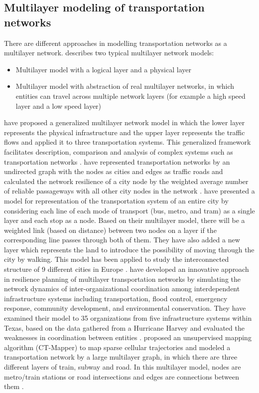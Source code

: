 \documentclass[11pt,twoside]{article}
\numberwithin{equation}{section}
\newcommand{\?}{\stackrel{?}{=}}
\begin{document}
\subsection{Multilayer modeling of transportation networks}
There are different approaches in modelling transportation networks as a multilayer network.
\citep{wu2020traffic} describes two typical multilayer network models:
\begin{itemize}
  \item Multilayer model with a logical layer and a physical layer
  \item Multilayer model with abstraction of real multilayer networks, in which entities can travel across multiple network layers (for example a high speed layer and a low speed layer)
\end{itemize}
\citet{kurant2006layered} have proposed a generalized multilayer network model in which the lower layer represents the
physical infrastructure and the upper layer represents the traffic flows and applied it to three transportation
systems. This generalized framework facilitates description, comparison and analysis of complex systems such as
transportation networks \citep{kurant2006layered}. \citet{ip2011resilience} have represented transportation networks by
an undirected graph with the nodes as cities and edges as traffic roads and calculated the network resilience of a city
node by the weighted average number of reliable passageways with all other city nodes in the network
\citep{ip2011resilience}. \citet{aleta2017multilayer} have presented a model for representation of the transportation
system of an entire city by considering each line of each mode of transport (bus, metro, and tram) as a single layer and
each stop as a node. Based on their multilayer model, there will be a weighted link (based on distance) between two
nodes on a layer if the corresponding line passes through both of them. They have also added a new layer which
represents the land to introduce the possibility of moving through the city by walking. This model has been applied to
study the interconnected structure of 9 different cities in Europe \citep{aleta2017multilayer}.  \citet{li2019modeling}
have developed an innovative approach in resilience planning of multilayer transportation networks by simulating the
network dynamics of inter-organizational coordination among interdependent infrastructure systems including
transportation, flood control, emergency response, community development, and environmental conservation. They have
examined their model to 35 organizations from five infrastructure systems within Texas, based on the data gathered from
a Hurricane Harvey and evaluated the weaknesses in coordination between entities
\citep{li2019modeling}. \citet{asgari2016ctmapper} proposed an unsupervised mapping algorithm (CT-Mapper) to map sparse
cellular trajectories and modeled a transportation network by a large multilayer graph, in which there are three
different layers of train, subway and road. In this multilayer model, nodes are metro/train stations or road
intersections and edges are connections between them \citep{asgari2016ctmapper}.
\end{document}
